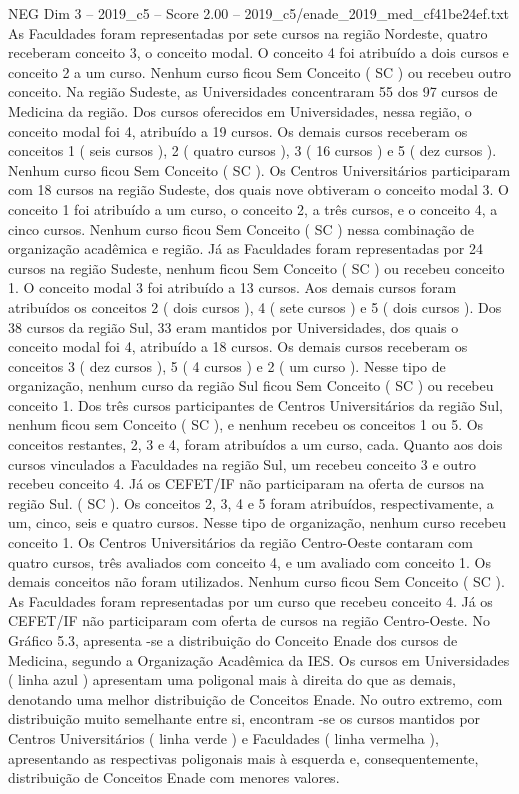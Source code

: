 \begin{textsample}{NEG Dim 3 – 2019\_c5 – Score 2.00 – 2019\_c5/enade\_2019\_med\_cf41be24ef.txt}
As Faculdades foram representadas por sete cursos na região Nordeste, quatro receberam conceito 3, o conceito modal.
O conceito 4 foi atribuído a dois cursos e conceito 2 a um curso.
Nenhum curso ficou Sem Conceito ( SC ) ou recebeu outro conceito.
Na região Sudeste, as Universidades concentraram 55 dos 97 cursos de Medicina da região.
Dos cursos oferecidos em Universidades, nessa região, o conceito modal foi 4, atribuído a 19 cursos.
Os demais cursos receberam os conceitos 1 ( seis cursos ), 2 ( quatro cursos ), 3 ( 16 cursos ) e 5 ( dez cursos ).
Nenhum curso ficou Sem Conceito ( SC ).
Os Centros Universitários participaram com 18 cursos na região Sudeste, dos quais nove obtiveram o conceito modal 3.
O conceito 1 foi atribuído a um curso, o conceito 2, a três cursos, e o conceito 4, a cinco cursos.
Nenhum curso ficou Sem Conceito ( SC ) nessa combinação de organização acadêmica e região.
Já as Faculdades foram representadas por 24 cursos na região Sudeste, nenhum ficou Sem Conceito ( SC ) ou recebeu conceito 1.
O conceito modal 3 foi atribuído a 13 cursos.
Aos demais cursos foram atribuídos os conceitos 2 ( dois cursos ), 4 ( sete cursos ) e 5 ( dois cursos ).
Dos 38 cursos da região Sul, 33 eram mantidos por Universidades, dos quais o conceito modal foi 4, atribuído a 18 cursos.
Os demais cursos receberam os conceitos 3 ( dez cursos ), 5 ( 4 cursos ) e 2 ( um curso ).
Nesse tipo de organização, nenhum curso da região Sul ficou Sem Conceito ( SC ) ou recebeu conceito 1.
Dos três cursos participantes de Centros Universitários da região Sul, nenhum ficou sem Conceito ( SC ), e nenhum recebeu os conceitos 1 ou 5.
Os conceitos restantes, 2, 3 e 4, foram atribuídos a um curso, cada.
Quanto aos dois cursos vinculados a Faculdades na região Sul, um recebeu conceito 3 e outro recebeu conceito 4.
Já os CEFET/IF não participaram na oferta de cursos na região Sul. ( SC ).
Os conceitos 2, 3, 4 e 5 foram atribuídos, respectivamente, a um, cinco, seis e quatro cursos.
Nesse tipo de organização, nenhum curso recebeu conceito 1.
Os Centros Universitários da região Centro-Oeste contaram com quatro cursos, três avaliados com conceito 4, e um avaliado com conceito 1.
Os demais conceitos não foram utilizados.
Nenhum curso ficou Sem Conceito ( SC ).
As Faculdades foram representadas por um curso que recebeu conceito 4.
Já os CEFET/IF não participaram com oferta de cursos na região Centro-Oeste.
No Gráfico 5.3, apresenta -se a distribuição do Conceito Enade dos cursos de Medicina, segundo a Organização Acadêmica da IES.
Os cursos em Universidades ( linha azul ) apresentam uma poligonal mais à direita do que as demais, denotando uma melhor distribuição de Conceitos Enade.
No outro extremo, com distribuição muito semelhante entre si, encontram -se os cursos mantidos por Centros Universitários ( linha verde ) e Faculdades ( linha vermelha ), apresentando as respectivas poligonais mais à esquerda e, consequentemente, distribuição de Conceitos Enade com menores valores.

\end{textsample}
